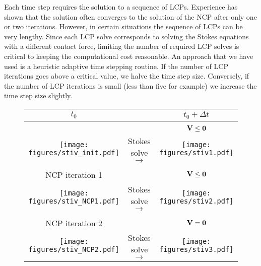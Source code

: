Each time step requires the solution to a sequence of LCPs. Experience has shown that the solution often converges to the solution of the NCP after only one or two iterations. However, in certain situations the sequence of LCPs can be very lengthy. Since each LCP solve corresponds to solving the Stokes equations with a different contact force, limiting the number of required LCP solves is critical to keeping the computational cost reasonable. An approach that we have used is a heuristic adaptive time stepping routine. If the number of LCP iterations goes above a critical value, we halve the time step size. Conversely, if the number of LCP iterations is small (less than five for example) we increase the time step size slightly.

\begin{figure}[!h]
\begin{center}
\begin{tabular}{c c c}
$t_0$ & & $t_0 + \Delta t$\\
\hline
\\
& & ${\mathbf{V}} \leq \mathbf{0}$\\
\begin{minipage}{0.35\textwidth}
\texttt{[image: figures/stiv\_init.pdf]}
\end{minipage} &   Stokes solve $\rightarrow$ &
\begin{minipage}{0.35\textwidth}
 \texttt{[image: figures/stiv1.pdf]}
 \end{minipage}\\
 \hline
 \\
NCP iteration 1 & & ${\mathbf{V}} \leq \mathbf{0}$\\
\begin{minipage}{0.35\textwidth}
\texttt{[image: figures/stiv\_NCP1.pdf]}
\end{minipage}
 & Stokes solve $\rightarrow$ & 
 \begin{minipage}{0.35\textwidth}
 \texttt{[image: figures/stiv2.pdf]} 
 \end{minipage}\\
 \hline
 \\
NCP iteration 2 & & ${\mathbf{V}} = \mathbf{0}$\\
\begin{minipage}{0.35\textwidth}
\texttt{[image: figures/stiv\_NCP2.pdf]} 
\end{minipage}
& Stokes solve $\rightarrow$ & 
\begin{minipage}{0.35\textwidth}
\texttt{[image: figures/stiv3.pdf]}

\end{minipage}
\end{tabular}
\end{center}
\end{figure}
